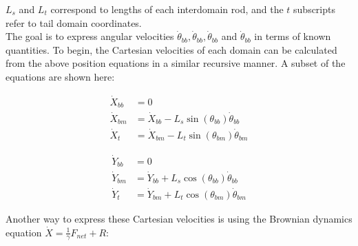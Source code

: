 \documentclass[9pt,twoside,lineno]{pnas-new}
\begin{document}
$L_s$ and $L_t$ correspond to lengths of each interdomain rod, and the $t$ subscripts refer to tail domain coordinates.\\

The goal is to express angular velocities $\dot{\theta}_{bb}, \dot{\theta}_{bb}, \dot{\theta}_{bb}$ and $\dot{\theta}_{bb}$ in terms of known quantities. To begin, the Cartesian velocities of each domain can be calculated from the above position equations in a similar recursive manner. A subset of the equations are shown here:

\noindent\begin{minipage}{0.49\linewidth}
\begin{align}
  \dot{X}_{bb} &= 0 \\
  \dot{X}_{bm} &= \dot{X}_{bb} - L_{s}\sin(\theta_{bb})\dot{\theta}_{bb} \label{cartesian-bmx}\\
  \dot{X}_{t } &= \dot{X}_{bm} - L_{t}\sin(\theta_{bm})\dot{\theta}_{bm}
\end{align}
\end{minipage}
\begin{minipage}{0.49\linewidth}
\begin{align}                                                                          
  \dot{Y}_{bb} &= 0 \\                                                        
  \dot{Y}_{bm} &= \dot{Y}_{bb} + L_{s}\cos(\theta_{bb})\dot{\theta}_{bb} \\
  \dot{Y}_{t}  &= \dot{Y}_{bm} + L_{t}\cos(\theta_{bm})\dot{\theta}_{bm}
\end{align}
\end{minipage}
\vspace{.5cm}

Another way to express these Cartesian velocities is using the Brownian dynamics equation $\dot{X} = \frac1\gamma F_{net} + R$:
\end{document}
